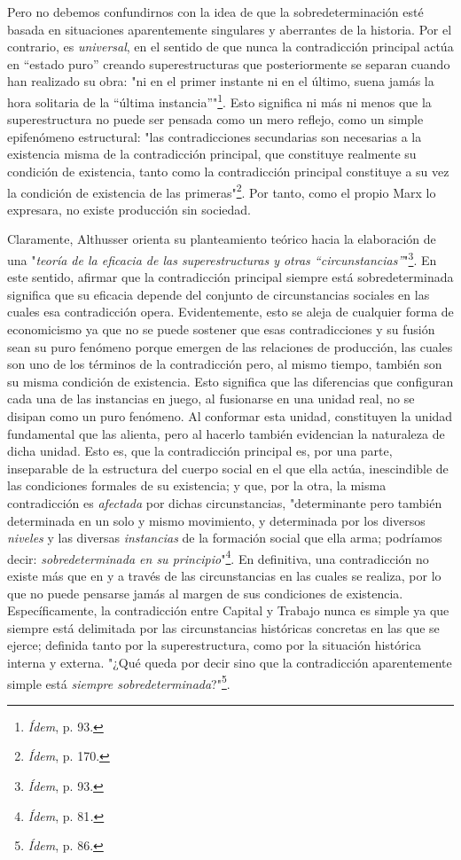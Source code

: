 \documentclass{book}
\begin{document}
Pero no debemos confundirnos con la idea de que la sobredeterminación
esté basada en situaciones aparentemente singulares y aberrantes de la
historia. Por el contrario, es \emph{universal}, en el sentido de que
nunca la contradicción principal actúa en ``estado puro'' creando
superestructuras que posteriormente se separan cuando han realizado su
obra: "ni en el primer instante ni en el último, suena jamás la hora
solitaria de la ``última instancia''"\footnote{\emph{Ídem}, p. 93.}.
Esto significa ni más ni menos que la superestructura no puede ser
pensada como un mero reflejo, como un simple epifenómeno estructural:
"las contradicciones secundarias son necesarias a la existencia misma de
la contradicción principal, que constituye realmente su condición de
existencia, tanto como la contradicción principal constituye a su vez la
condición de existencia de las primeras"\footnote{\emph{Ídem}, p. 170.}.
Por tanto, como el propio Marx lo expresara, no existe producción sin
sociedad.

Claramente, Althusser orienta su planteamiento teórico hacia la
elaboración de una "\emph{teoría de la eficacia de las superestructuras
y otras ``circunstancias''}"\footnote{\emph{Ídem}, p. 93.}. En este
sentido, afirmar que la contradicción principal siempre está
sobredeterminada significa que su eficacia depende del conjunto de
circunstancias sociales en las cuales esa contradicción opera.
Evidentemente, esto se aleja de cualquier forma de economicismo ya que
no se puede sostener que esas contradicciones y su fusión sean su puro
fenómeno porque emergen de las relaciones de producción, las cuales son
uno de los términos de la contradicción pero, al mismo tiempo, también
son su misma condición de existencia. Esto significa que las diferencias
que configuran cada una de las instancias en juego, al fusionarse en una
unidad real, no se disipan como un puro fenómeno. Al conformar esta
unidad\emph{,} constituyen la unidad fundamental que las alienta, pero
al hacerlo también evidencian la naturaleza de dicha unidad. Esto es,
que la contradicción principal es, por una parte, inseparable de la
estructura del cuerpo social en el que ella actúa, inescindible de las
condiciones formales de su existencia; y que, por la otra, la misma
contradicción es \emph{afectada} por dichas circunstancias,
"determinante pero también determinada en un solo y mismo movimiento, y
determinada por los diversos \emph{niveles} y las diversas
\emph{instancias} de la formación social que ella arma; podríamos decir:
\emph{sobredeterminada en su principio}"\footnote{\emph{Ídem}, p.
  81\emph{.}}. En definitiva, una contradicción no existe más que en y a
través de las circunstancias en las cuales se realiza, por lo que no
puede pensarse jamás al margen de sus condiciones de existencia.
Específicamente, la contradicción entre Capital y Trabajo nunca es
simple ya que siempre está delimitada por las circunstancias históricas
concretas en las que se ejerce; definida tanto por la superestructura,
como por la situación histórica interna y externa. "¿Qué queda por decir
sino que la contradicción aparentemente simple está \emph{siempre
sobredeterminada}?"\footnote{\emph{Ídem}, p. 86.}.
\end{document}
